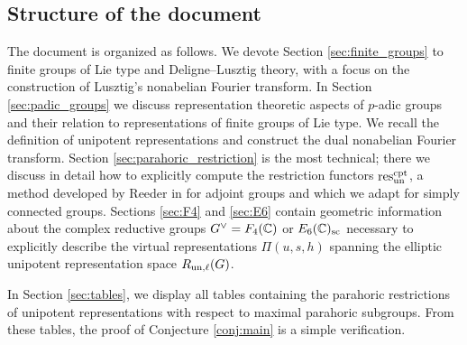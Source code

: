 \subsection*{Structure of the document}
The document is organized as follows. We devote Section \ref{sec:finite_groups} to finite groups of Lie type and Deligne--Lusztig theory, with a focus on the construction of Lusztig's nonabelian Fourier transform. In Section \ref{sec:padic_groups} we discuss representation theoretic aspects of $p$-adic groups and their relation to representations of finite groups of Lie type. We recall the definition of unipotent representations and construct the dual nonabelian Fourier transform. Section \ref{sec:parahoric_restriction} is the most technical; there we discuss in detail how to explicitly compute the restriction functors $\mathrm{res}_{\mathrm{un}}^{\mathrm{cpt}}$, a method developed by Reeder in \cite{Reeder2000} for adjoint groups and which we adapt for simply connected groups. Sections \ref{sec:F4} and \ref{sec:E6} contain geometric information about the complex reductive groups $G^\vee=F_4(\mathbb{C})$ or $E_6(\mathbb{C})_{\mathrm{sc}}$ necessary to explicitly describe the virtual representations $\Pi(u,s,h)$ spanning the elliptic unipotent representation space $R_{\mathrm{un},\mathrm{\ell}}(G)$. 

In Section \ref{sec:tables}, we display all tables containing the parahoric restrictions of unipotent representations with respect to maximal parahoric subgroups. From these tables, the proof of Conjecture \ref{conj:main} is a simple verification.


